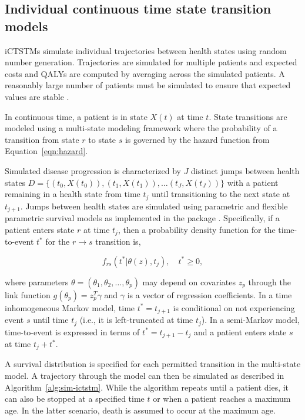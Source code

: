 \documentclass[article, nojss]{jss}\usepackage[]{graphicx}\usepackage[]{color}
\begin{document}
\subsection{Individual continuous time state transition models} \label{sec:iCTSTMs}
iCTSTMs simulate individual trajectories between health states using random number generation. Trajectories are simulated for multiple patients and expected costs and QALYs are computed by averaging across the simulated patients. A reasonably large number of patients must be simulated to ensure that expected values are stable \citep{ohagan2007monte}. 

In continuous time, a patient is in state $X(t)$ at time $t$. State transitions are modeled using a multi-state modeling framework \citep{putter2007tutorial} where the probability of a transition from state $r$ to state $s$ is governed by the hazard function from Equation~\ref{eqn:hazard}.

Simulated disease progression is characterized by $J$ distinct jumps between health states $D = \{(t_0, X(t_0)), (t_1, X(t_1)), \ldots (t_J, X(t_J))\}$ with a patient remaining in a health state from time $t_j$ until transitioning to the next state at $t_{j+1}$. Jumps between health states are simulated using parametric and flexible parametric survival models as implemented in the  package \citep{jackson2016flexsurv}. Specifically, if a patient enters state $r$ at time $t_j$, then a probability density function for the time-to-event $t^*$ for the $r \rightarrow s$ transition is, 

\begin{equation}
f_{rs}(t^*|\theta(z), t_j), \quad t^*\geq 0,
\end{equation}

where parameters $\theta = (\theta_1, \theta_2, \ldots, \theta_p)$ may depend on covariates $z_p$ through the link function $g(\theta_p) = z_p^T \gamma$ and $\gamma$ is a vector of regression coefficients. In a time inhomogeneous Markov model, time $t^*=t_{j+1}$ is conditional on not experiencing event $s$ until time $t_j$ (i.e., it is left-truncated at time $t_j$). In a semi-Markov model, time-to-event is expressed in terms of $t^* = t_{j+1}-t_j$ and a patient enters state $s$ at time $t_j + t^*$.

A survival distribution is specified for each permitted transition in the multi-state model. A trajectory through the model can then be simulated as described in Algorithm~\ref{alg:sim-ictstm}. While the algorithm repeats until a patient dies, it can also be stopped at a specified time $t$ or when a patient reaches a maximum age. In the latter scenario, death is assumed to occur at the maximum age.
 
\end{document}
